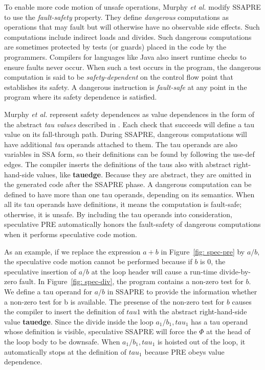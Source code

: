 To enable more code motion of unsafe operations, Murphy {\it et al.} modify 
SSAPRE to use the \emph{fault-safety} property\cite{Murphy08}.   
They define \emph{dangerous}
computations as operations that may fault but will otherwise have no observable
side effects.  Such computations include indirect loads and divides.  Such
dangerous computations are sometimes protected by tests (or guards) placed in
the code by the programmers.  Compilers for languages like Java also insert 
runtime checks to ensure faults never occur. When such a test occurs in the
program, the dangerous computation is said to be \emph{safety-dependent} on
the control flow point that establishes its safety.  A dangerous instruction
is \emph{fault-safe} at any point in the program where its safety dependence
is satisfied.

Murphy {\it et al.} represent safety dependences as value dependences in the
form of the abstract \emph{tau values} described in \cite{Menon06}.  Each check
that succeeds will define a tau value on its fall-through path.  During SSAPRE,
dangerous computations will have additional \emph{tau} operands attached to 
them.  The tau
operands are also variables in SSA form, so their definitions can
be found by following the use-def edges.  The compiler inserts the definitions
of the taus also with abstract right-hand-side values, like {\bf tauedge}.
Because they are abstract, they
are omitted in the generated code after the SSAPRE phase.  A dangerous
computation can be defined to have more than one tau operands, depending on
its semantics.  When all its tau operands have definitions, 
it means the computation is fault-safe; otherwise, it is unsafe.  
By including the tau operands into consideration, speculative PRE automatically
honors the fault-safety of dangerous computations when it performs speculative
code motion.

As an example, if we replace the expression $a+b$ in Figure~\ref{fig: spec-pre}
by $a/b$, the speculative code motion cannot be performed because if $b$ is 0,
the speculative insertion of $a/b$ at the loop header will cause a run-time
divide-by-zero fault.  In Figure~\ref{fig: spec-div}, the program contains a 
non-zero test for $b$.  We define a tau operand for $a/b$ in SSAPRE to
provide the information whether a non-zero test for b is available.  The
presense of the non-zero test for $b$ causes the compiler to insert the
definition of $tau1$ with the abstract right-hand-side value {\bf tauedge}.
Since the divide inside the loop $a_1/b_1,tau_1$ has a tau operand whose
definition is visible, speculative SSAPRE will force the $\Phi$ at the head
of the loop body to be downsafe.  When $a_1/b_1,tau_1$ is hoisted out of the
loop, it automatically stops at the definition of $tau_1$ because PRE obeys
value dependence.

